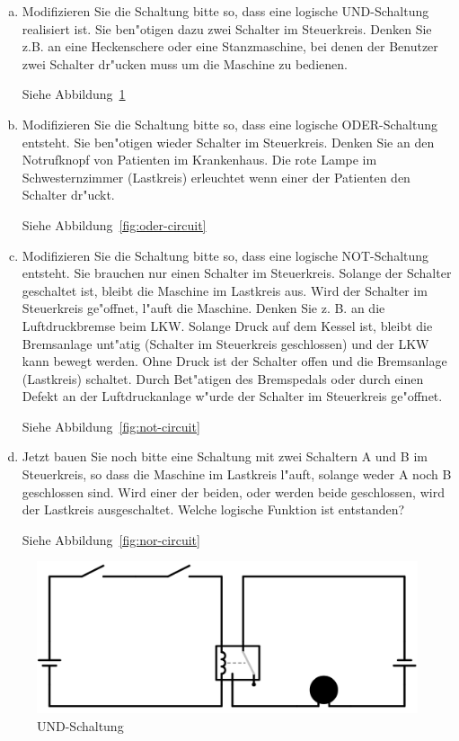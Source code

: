 \documentclass[10pt, oneside]{article}
\begin{document}
\begin{enumerate}[(a)]
    \item Modifizieren Sie die Schaltung bitte so, dass eine logische
        UND-Schaltung realisiert ist. Sie ben"otigen dazu zwei Schalter im
        Steuerkreis. Denken Sie z.B. an eine Heckenschere oder eine
        Stanzmaschine, bei denen der Benutzer zwei Schalter dr"ucken muss um
        die Maschine zu bedienen.

        Siehe Abbildung~\ref{fig:und-circuit}

    \item Modifizieren Sie die Schaltung bitte so, dass eine logische
        ODER-Schaltung entsteht. Sie ben"otigen wieder Schalter im Steuerkreis.
        Denken Sie an den Notrufknopf von Patienten im Krankenhaus. Die rote
        Lampe im Schwesternzimmer (Lastkreis) erleuchtet wenn einer der
        Patienten den Schalter dr"uckt.

        Siehe Abbildung~\ref{fig:oder-circuit}

    \item Modifizieren Sie die Schaltung bitte so, dass eine logische
        NOT-Schaltung entsteht. Sie brauchen nur einen Schalter im Steuerkreis.
        Solange der Schalter geschaltet ist, bleibt die Maschine im Lastkreis
        aus. Wird der Schalter im Steuerkreis ge"offnet, l"auft die Maschine.
        Denken Sie z. B. an die Luftdruckbremse beim LKW. Solange Druck auf dem
        Kessel ist, bleibt die Bremsanlage unt"atig (Schalter im Steuerkreis
        geschlossen) und der LKW kann bewegt werden. Ohne Druck ist der
        Schalter offen und die Bremsanlage (Lastkreis) schaltet. Durch
        Bet"atigen des Bremspedals oder durch einen Defekt an der
        Luftdruckanlage w"urde der Schalter im Steuerkreis ge"offnet.

        Siehe Abbildung~\ref{fig:not-circuit}

    \item Jetzt bauen Sie noch bitte eine Schaltung mit zwei Schaltern A und B
        im Steuerkreis, so dass die Maschine im Lastkreis l"auft, solange weder
        A noch B geschlossen sind. Wird einer der beiden, oder werden beide
        geschlossen, wird der Lastkreis ausgeschaltet. Welche logische Funktion
        ist entstanden?

        Siehe Abbildung~\ref{fig:nor-circuit}
\end{enumerate}

\begin{figure}[p]
    \includegraphics[width=1\textwidth]{./assets/und-circuit.png}
    \caption{UND-Schaltung}
    \label{fig:und-circuit}
\end{figure}
\end{document}
